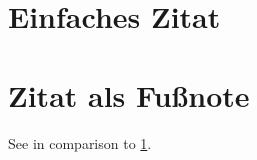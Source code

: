 \documentclass[
    add-bibliography,
    add-tocs-to-toc,
    language = ngerman,
    debug
]{iodhbwm}
\begin{document}
    \tableofcontents
    \chapter{Einfaches Zitat}\label{chap:test}
        \blindtext
    
    \chapter{Zitat als Fußnote}
        See  in comparison to \ref{chap:test}.
\end{document}
